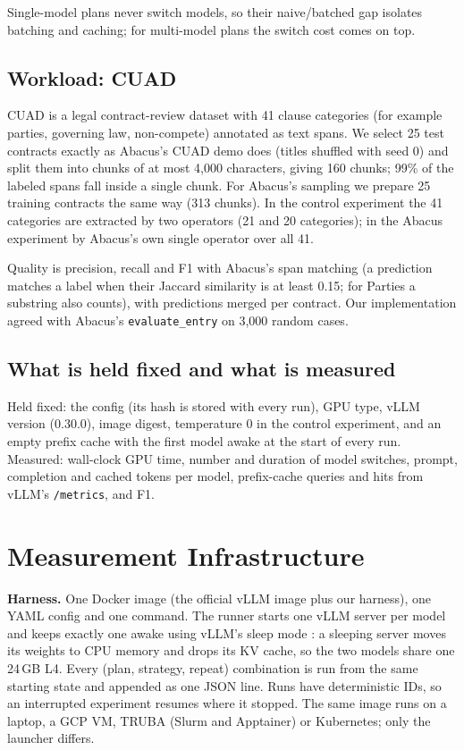 \documentclass[11pt,a4paper]{article}
\newcommand{\code}[1]{\texttt{#1}}
\begin{document}
Single-model plans never switch models, so their naive/batched gap isolates batching and caching;
for multi-model plans the switch cost comes on top.

\subsection{Workload: CUAD}

CUAD \cite{hendrycks2021cuad} is a legal contract-review dataset with 41 clause categories (for
example parties, governing law, non-compete) annotated as text spans. We select 25 test contracts
exactly as Abacus's CUAD demo does (titles shuffled with seed 0) and split them into chunks of at most
4,000 characters, giving 160 chunks; 99\% of the labeled spans fall inside a single chunk. For
Abacus's sampling we prepare 25 training contracts the same way (313 chunks). In the control
experiment the 41 categories are extracted by two operators (21 and 20 categories); in the Abacus
experiment by Abacus's own single operator over all 41.

Quality is precision, recall and F1 with Abacus's span matching (a prediction matches a label when
their Jaccard similarity is at least 0.15; for Parties a substring also counts), with predictions
merged per contract. Our implementation agreed with Abacus's \code{evaluate\_entry} on 3,000 random
cases.

\subsection{What is held fixed and what is measured}

Held fixed: the config (its hash is stored with every run), GPU type, vLLM version (0.30.0), image
digest, temperature 0 in the control experiment, and an empty prefix cache with the first model awake at the start of every
run. Measured: wall-clock GPU time, number and duration of model switches, prompt, completion and
cached tokens per model, prefix-cache queries and hits from vLLM's \code{/metrics}, and F1.

\section{Measurement Infrastructure}\label{sec:impl}

\textbf{Harness.} One Docker image (the official vLLM image plus our harness), one YAML config and
one command. The runner starts one vLLM server per model and keeps exactly one awake using vLLM's
sleep mode \cite{kwon2023vllm}: a sleeping server moves its weights to CPU memory and drops its KV
cache, so the two models share one 24\,GB L4. Every (plan, strategy, repeat) combination is run from
the same starting state and appended as one JSON line. Runs have deterministic IDs, so an interrupted
experiment resumes where it stopped. The same image runs on a laptop, a GCP VM, TRUBA (Slurm and
Apptainer) or Kubernetes; only the launcher differs.
\end{document}
